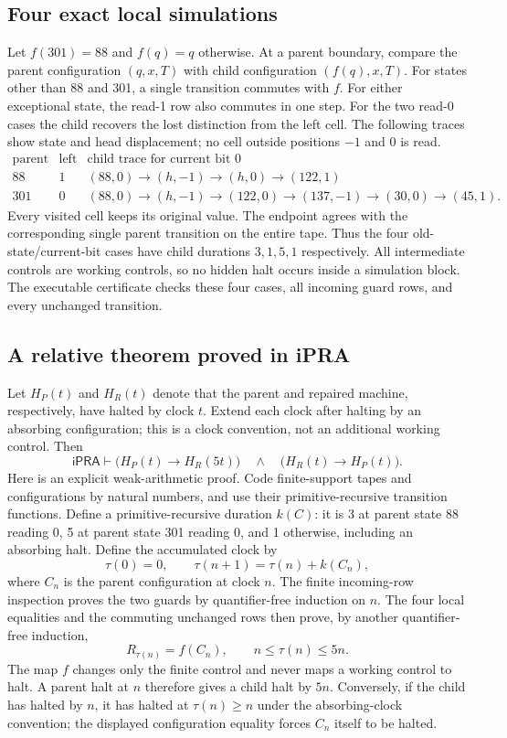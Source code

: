 \subsection{Four exact local simulations}

Let $f(301)=88$ and $f(q)=q$ otherwise. At a parent boundary, compare the
parent configuration $(q,x,T)$ with child configuration $(f(q),x,T)$.
For states other than 88 and 301, a single transition commutes with $f$.
For either exceptional state, the read-1 row also commutes in one step.
For the two read-0 cases the child recovers the lost distinction from the
left cell. The following traces show state and head displacement; no
cell outside positions $-1$ and $0$ is read.
\[
\begin{array}{c|c|l}
\text{parent state}&\text{left bit}&\text{child trace for current bit }0\\\hline
88&1&(88,0)\to(h,-1)\to(h,0)\to(122,1)\\
301&0&(88,0)\to(h,-1)\to(122,0)\to(137,-1)\to(30,0)\to(45,1).
\end{array}
\]
Every visited cell keeps its original value. The endpoint agrees with the
corresponding single parent transition on the entire tape. Thus the four
old-state/current-bit cases have child durations $3,1,5,1$ respectively.
All intermediate controls are working controls, so no hidden halt occurs
inside a simulation block. The executable certificate checks these four
cases, all incoming guard rows, and every unchanged transition.

\subsection{A relative theorem proved in iPRA}

Let $H_P(t)$ and $H_R(t)$ denote that the parent and repaired machine,
respectively, have halted by clock $t$. Extend each clock after halting by
an absorbing configuration; this is a clock convention, not an additional
working control. Then
\[
 \mathsf{iPRA}\vdash
 \bigl(H_P(t)\to H_R(5t)\bigr)
 \quad\wedge\quad
 \bigl(H_R(t)\to H_P(t)\bigr).
\]
Here is an explicit weak-arithmetic proof. Code finite-support tapes and
configurations by natural numbers, and use their primitive-recursive
transition functions. Define a primitive-recursive duration $k(C)$: it is
3 at parent state 88 reading 0, 5 at parent state 301 reading 0, and 1
otherwise, including an absorbing halt. Define the accumulated clock by
\[
 \tau(0)=0,\qquad \tau(n+1)=\tau(n)+k(C_n),
\]
where $C_n$ is the parent configuration at clock $n$.
The finite incoming-row inspection proves the two guards by
quantifier-free induction on $n$. The four local equalities and the
commuting unchanged rows then prove, by another quantifier-free induction,
\[
 R_{\tau(n)}=f(C_n),\qquad n\leq\tau(n)\leq5n.
\]
The map $f$ changes only the finite control and never maps a working
control to halt. A parent halt at $n$ therefore gives a child halt by
$5n$. Conversely, if the child has halted by $n$, it has halted at
$\tau(n)\geq n$ under the absorbing-clock convention; the displayed
configuration equality forces $C_n$ itself to be halted.

